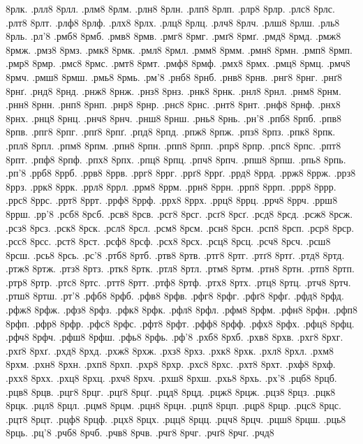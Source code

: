 {8рлк.
.рлл8
8рлл.
.рлм8
8рлм.
.рлн8
8рлн.
.рлп8
8рлп.
.рлр8
8рлр.
.рлс8
8рлс.
.рлт8
8рлт.
.рлф8
8рлф.
.рлх8
8рлх.
.рлц8
8рлц.
.рлч8
8рлч.
.рлш8
8рлш.
.рль8
8рль.
.рл'8
.рмб8
8рмб.
.рмв8
8рмв.
.рмг8
8рмг.
.рмґ8
8рмґ.
.рмд8
8рмд.
.рмж8
8рмж.
.рмз8
8рмз.
.рмк8
8рмк.
.рмл8
8рмл.
.рмм8
8рмм.
.рмн8
8рмн.
.рмп8
8рмп.
.рмр8
8рмр.
.рмс8
8рмс.
.рмт8
8рмт.
.рмф8
8рмф.
.рмх8
8рмх.
.рмц8
8рмц.
.рмч8
8рмч.
.рмш8
8рмш.
.рмь8
8рмь.
.рм'8
.рнб8
8рнб.
.рнв8
8рнв.
.рнг8
8рнг.
.рнґ8
8рнґ.
.рнд8
8рнд.
.рнж8
8рнж.
.рнз8
8рнз.
.рнк8
8рнк.
.рнл8
8рнл.
.рнм8
8рнм.
.рнн8
8рнн.
.рнп8
8рнп.
.рнр8
8рнр.
.рнс8
8рнс.
.рнт8
8рнт.
.рнф8
8рнф.
.рнх8
8рнх.
.рнц8
8рнц.
.рнч8
8рнч.
.рнш8
8рнш.
.рнь8
8рнь.
.рн'8
.рпб8
8рпб.
.рпв8
8рпв.
.рпг8
8рпг.
.рпґ8
8рпґ.
.рпд8
8рпд.
.рпж8
8рпж.
.рпз8
8рпз.
.рпк8
8рпк.
.рпл8
8рпл.
.рпм8
8рпм.
.рпн8
8рпн.
.рпп8
8рпп.
.рпр8
8рпр.
.рпс8
8рпс.
.рпт8
8рпт.
.рпф8
8рпф.
.рпх8
8рпх.
.рпц8
8рпц.
.рпч8
8рпч.
.рпш8
8рпш.
.рпь8
8рпь.
.рп'8
.ррб8
8ррб.
.ррв8
8ррв.
.ррг8
8ррг.
.ррґ8
8ррґ.
.ррд8
8ррд.
.ррж8
8ррж.
.ррз8
8ррз.
.ррк8
8ррк.
.ррл8
8ррл.
.ррм8
8ррм.
.ррн8
8ррн.
.ррп8
8ррп.
.ррр8
8ррр.
.ррс8
8ррс.
.ррт8
8ррт.
.ррф8
8ррф.
.ррх8
8ррх.
.ррц8
8ррц.
.ррч8
8ррч.
.ррш8
8ррш.
.рр'8
.рсб8
8рсб.
.рсв8
8рсв.
.рсг8
8рсг.
.рсґ8
8рсґ.
.рсд8
8рсд.
.рсж8
8рсж.
.рсз8
8рсз.
.рск8
8рск.
.рсл8
8рсл.
.рсм8
8рсм.
.рсн8
8рсн.
.рсп8
8рсп.
.рср8
8рср.
.рсс8
8рсс.
.рст8
8рст.
.рсф8
8рсф.
.рсх8
8рсх.
.рсц8
8рсц.
.рсч8
8рсч.
.рсш8
8рсш.
.рсь8
8рсь.
.рс'8
.ртб8
8ртб.
.ртв8
8ртв.
.ртг8
8ртг.
.ртґ8
8ртґ.
.ртд8
8ртд.
.ртж8
8ртж.
.ртз8
8ртз.
.ртк8
8ртк.
.ртл8
8ртл.
.ртм8
8ртм.
.ртн8
8ртн.
.ртп8
8ртп.
.ртр8
8ртр.
.ртс8
8ртс.
.ртт8
8ртт.
.ртф8
8ртф.
.ртх8
8ртх.
.ртц8
8ртц.
.ртч8
8ртч.
.ртш8
8ртш.
.рт'8
.рфб8
8рфб.
.рфв8
8рфв.
.рфг8
8рфг.
.рфґ8
8рфґ.
.рфд8
8рфд.
.рфж8
8рфж.
.рфз8
8рфз.
.рфк8
8рфк.
.рфл8
8рфл.
.рфм8
8рфм.
.рфн8
8рфн.
.рфп8
8рфп.
.рфр8
8рфр.
.рфс8
8рфс.
.рфт8
8рфт.
.рфф8
8рфф.
.рфх8
8рфх.
.рфц8
8рфц.
.рфч8
8рфч.
.рфш8
8рфш.
.рфь8
8рфь.
.рф'8
.рхб8
8рхб.
.рхв8
8рхв.
.рхг8
8рхг.
.рхґ8
8рхґ.
.рхд8
8рхд.
.рхж8
8рхж.
.рхз8
8рхз.
.рхк8
8рхк.
.рхл8
8рхл.
.рхм8
8рхм.
.рхн8
8рхн.
.рхп8
8рхп.
.рхр8
8рхр.
.рхс8
8рхс.
.рхт8
8рхт.
.рхф8
8рхф.
.рхх8
8рхх.
.рхц8
8рхц.
.рхч8
8рхч.
.рхш8
8рхш.
.рхь8
8рхь.
.рх'8
.рцб8
8рцб.
.рцв8
8рцв.
.рцг8
8рцг.
.рцґ8
8рцґ.
.рцд8
8рцд.
.рцж8
8рцж.
.рцз8
8рцз.
.рцк8
8рцк.
.рцл8
8рцл.
.рцм8
8рцм.
.рцн8
8рцн.
.рцп8
8рцп.
.рцр8
8рцр.
.рцс8
8рцс.
.рцт8
8рцт.
.рцф8
8рцф.
.рцх8
8рцх.
.рцц8
8рцц.
.рцч8
8рцч.
.рцш8
8рцш.
.рць8
8рць.
.рц'8
.рчб8
8рчб.
.рчв8
8рчв.
.рчг8
8рчг.
.рчґ8
8рчґ.
.рчд8
}
